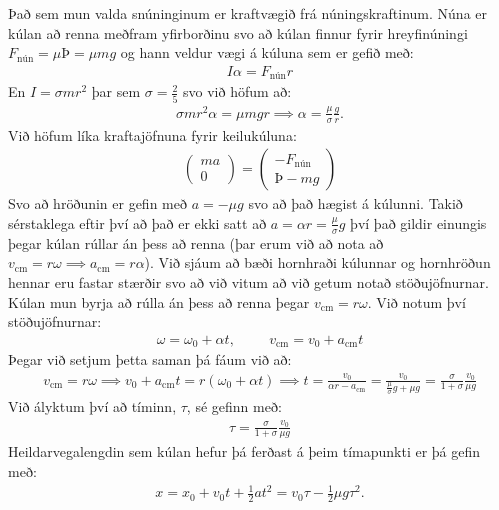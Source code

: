 \ifdefined \wholebook \else\documentclass[oneside]{book}\usepackage{EdlBook}\graphicspath{{figures/}}
\begin{document}
Það sem mun valda snúninginum er kraftvægið frá núningskraftinum. Núna er kúlan að renna meðfram yfirborðinu svo að kúlan finnur fyrir hreyfinúningi $F_{\text{nún}} = \mu Þ = \mu mg$ og hann veldur vægi á kúluna sem er gefið með:
\begin{align*}
    I\alpha = F_{\text{nún}}r
\end{align*}
En $I = \sigma mr^2$ þar sem $\sigma = \frac{2}{5}$ svo við höfum að:
\begin{align*}
    \sigma mr^2\alpha = \mu mgr \implies \alpha = \frac{\mu}{\sigma} \frac{g}{r}.
\end{align*}
Við höfum líka kraftajöfnuna fyrir keilukúluna:
\begin{align*}
    \begin{pmatrix} ma \\ 0 \end{pmatrix} = \begin{pmatrix} -F_{\text{nún}} \\ Þ - mg \end{pmatrix}
\end{align*}
Svo að hröðunin er gefin með $a = -\mu g$ svo að það hægist á kúlunni. Takið sérstaklega eftir því að það er ekki satt að $a = \alpha r = \frac{\mu}{\sigma}g$ því það gildir einungis þegar kúlan rúllar án þess að renna (þar erum við að nota að $v_{\text{cm}} = r\omega \implies a_{\text{cm}} = r\alpha$). Við sjáum að bæði hornhraði kúlunnar og hornhröðun hennar eru fastar stærðir svo að við vitum að við getum notað stöðujöfnurnar. Kúlan mun byrja að rúlla án þess að renna þegar $v_{\text{cm}} = r\omega$. Við notum því stöðujöfnurnar:
\begin{align*}
    \omega = \omega_0 + \alpha t, \hspace{1cm} v_{\text{cm}} = v_0 + a_{\text{cm}}t
\end{align*}
Þegar við setjum þetta saman þá fáum við að:
\begin{align*}
    v_{\text{cm}} = r\omega \implies v_0 + a_{\text{cm}}t = r\left( \omega_0 +\alpha t \right) \implies t = \frac{v_0}{\alpha r - a_{\text{cm}}} = \frac{v_0}{\frac{\mu}{\sigma}g + \mu g} = \frac{\sigma}{1+\sigma}\frac{v_0}{\mu g}
\end{align*}
Við ályktum því að tíminn, $\tau$, sé gefinn með:
\begin{align*}
    \tau = \frac{\sigma}{1+\sigma}\frac{v_0}{\mu g}
\end{align*}
Heildarvegalengdin sem kúlan hefur þá ferðast á þeim tímapunkti er þá gefin með:
\begin{align*}
    x = x_0 + v_0 t + \frac{1}{2}at^2 = v_0 \tau - \frac{1}{2}\mu g \tau^2.
\end{align*}
\end{document}
